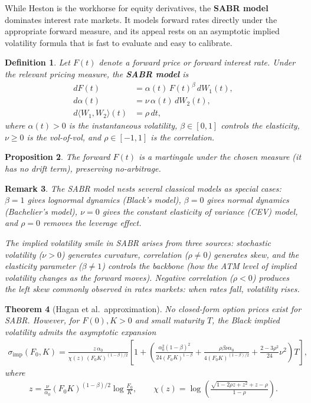 \documentclass{report}
\theoremstyle{spacedplain}
\newtheorem{theorem}{Theorem}[section]
\newtheorem{proposition}[theorem]{Proposition}
\theoremstyle{spaceddefinition}
\newtheorem{definition}[theorem]{Definition}
\theoremstyle{spacedremark}
\newtheorem{remark}[theorem]{Remark}
\begin{document}
While Heston is the workhorse for equity derivatives, the \textbf{SABR model} dominates interest rate markets. It models forward rates directly under the appropriate forward measure, and its appeal rests on an asymptotic implied volatility formula that is fast to evaluate and easy to calibrate.

\begin{definition}
Let $F(t)$ denote a forward price or forward interest rate. Under the relevant pricing measure, the \textbf{SABR model} is
\begin{align}
    dF(t) &= \alpha(t)\,F(t)^\beta\,dW_1(t), \\
    d\alpha(t) &= \nu\,\alpha(t)\,dW_2(t), \\
    d\langle W_1, W_2\rangle(t) &= \rho\,dt,
\end{align}
where $\alpha(t) > 0$ is the instantaneous volatility, $\beta \in [0,1]$ controls the elasticity, $\nu \geq 0$ is the vol-of-vol, and $\rho \in [-1,1]$ is the correlation.
\end{definition}

\begin{proposition}
The forward $F(t)$ is a martingale under the chosen measure (it has no drift term), preserving no-arbitrage.
\end{proposition}

\begin{remark}
The SABR model nests several classical models as special cases: $\beta = 1$ gives lognormal dynamics (Black's model), $\beta = 0$ gives normal dynamics (Bachelier's model), $\nu = 0$ gives the constant elasticity of variance (CEV) model, and $\rho = 0$ removes the leverage effect.

The implied volatility smile in SABR arises from three sources: stochastic volatility ($\nu > 0$) generates curvature, correlation ($\rho \neq 0$) generates skew, and the elasticity parameter ($\beta \neq 1$) controls the backbone (how the ATM level of implied volatility changes as the forward moves). Negative correlation ($\rho < 0$) produces the left skew commonly observed in rates markets: when rates fall, volatility rises.
\end{remark}

\begin{theorem}[Hagan et al.\ approximation]
No closed-form option prices exist for SABR. However, for $F(0), K > 0$ and small maturity $T$, the Black implied volatility admits the asymptotic expansion
\begin{align}
    \sigma_{\mathrm{imp}}(F_0,K) = \frac{z\,\alpha_0}{\chi(z)\,(F_0 K)^{(1-\beta)/2}}\left[1 + \left(\frac{\alpha_0^2(1-\beta)^2}{24(F_0 K)^{1-\beta}} + \frac{\rho\beta\nu\alpha_0}{4(F_0 K)^{(1-\beta)/2}} + \frac{2-3\rho^2}{24}\nu^2\right)T\right],
\end{align}
where
\begin{align}
    z = \frac{\nu}{\alpha_0}(F_0 K)^{(1-\beta)/2}\log\!\frac{F_0}{K}, \qquad \chi(z) = \log\!\left(\frac{\sqrt{1-2\rho z+z^2}+z-\rho}{1-\rho}\right).
\end{align}
\end{theorem}
\end{document}
